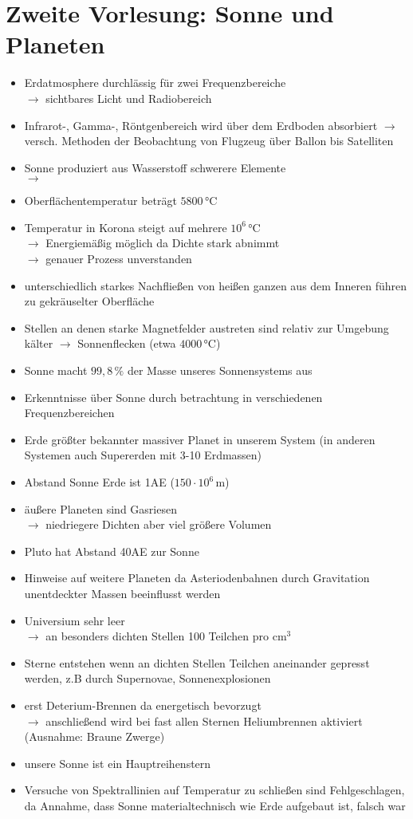 \section{Zweite Vorlesung: Sonne und Planeten}
\begin{itemize}
\item Erdatmosphere durchlässig für zwei Frequenzbereiche\\
$\longrightarrow$ sichtbares Licht und Radiobereich
\item Infrarot-, Gamma-, Röntgenbereich wird über dem Erdboden absorbiert
$\longrightarrow$ versch. Methoden der Beobachtung von Flugzeug über Ballon bis Satelliten
\item Sonne produziert aus Wasserstoff schwerere Elemente\\
$\longrightarrow$
\item Oberflächentemperatur beträgt $5800\,\text{°C}$
\item Temperatur in Korona steigt auf mehrere $10^6\,\text{°C}$\\
$\longrightarrow$ Energiemäßig möglich da Dichte stark abnimmt\\
$\longrightarrow$ genauer Prozess unverstanden
\item unterschiedlich starkes Nachfließen von heißen ganzen aus dem Inneren führen zu gekräuselter Oberfläche
\item Stellen an denen starke Magnetfelder austreten sind relativ zur Umgebung kälter
$\longrightarrow$ Sonnenflecken (etwa $4000\,\text{°C}$)
\item Sonne macht $99,8\,\%$ der Masse unseres Sonnensystems aus
\item Erkenntnisse über Sonne durch betrachtung in verschiedenen Frequenzbereichen
\item Erde größter bekannter massiver Planet in unserem System (in anderen Systemen auch Supererden mit 3-10 Erdmassen)
\item Abstand Sonne Erde ist 1AE ($150\cdot 10^6\,\text{m}$)
\item äußere Planeten sind Gasriesen\\
$\longrightarrow$ niedriegere Dichten aber viel größere Volumen
\item Pluto hat Abstand 40AE zur Sonne
\item Hinweise auf weitere Planeten da Asteriodenbahnen durch Gravitation unentdeckter Massen beeinflusst werden
\item Universium sehr leer\\
$\longrightarrow$ an besonders dichten Stellen 100 Teilchen pro $\text{cm}^3$
\item Sterne entstehen wenn an dichten Stellen Teilchen aneinander gepresst werden, z.B durch Supernovae, Sonnenexplosionen
\item erst Deterium-Brennen da energetisch bevorzugt\\
$\longrightarrow$ anschließend wird bei fast allen Sternen Heliumbrennen aktiviert (Ausnahme: Braune Zwerge)
\item unsere Sonne ist ein Hauptreihenstern
\item Versuche von Spektrallinien auf Temperatur zu schließen sind Fehlgeschlagen, da Annahme, dass Sonne materialtechnisch wie Erde aufgebaut ist, falsch war


\end{itemize}
